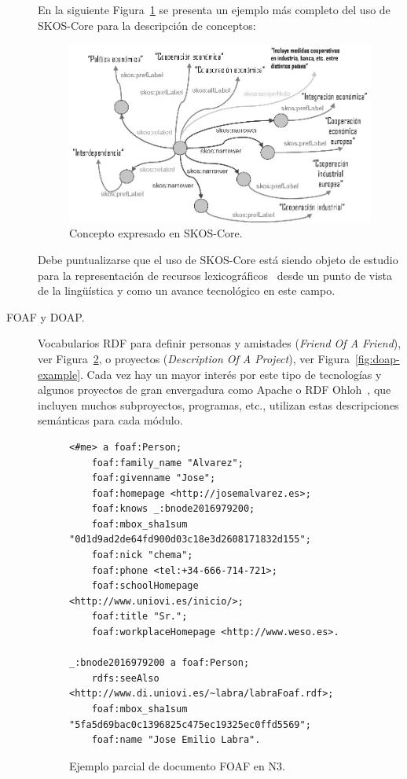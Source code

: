 \begin{description}
En la siguiente Figura~\ref{fig:skos} se presenta un ejemplo más completo del
uso de SKOS-Core para la descripción de conceptos:
 
\begin{figure}[!htbp]
\centering
	\includegraphics[width=14cm]{images/skos}
\caption{Concepto expresado en SKOS-Core.}
\label{fig:skos}
\end{figure}

Debe puntualizarse que el uso de SKOS-Core está siendo objeto de estudio para la
representación de recursos lexicográficos~\cite{Milin} desde un punto de vista de la
lingüística y como un avance tecnológico en este campo.

\item[\gls{FOAF} y \gls{DOAP}.] Vocabularios RDF para definir personas y amistades (\textit{Friend Of A Friend}), ver Figura~\ref{fig:foaf-example}, o 
proyectos (\textit{Description Of A Project}), 
ver Figura~\ref{fig:doap-example}. Cada vez hay un mayor interés por este tipo de tecnologías y algunos proyectos de gran envergadura como 
Apache o RDF Ohloh~\cite{Ferndez08rdfohloh}, que incluyen muchos subproyectos, programas, etc., utilizan estas
descripciones semánticas para cada módulo.

\begin{figure}[!htbp]
\centering
  \begin{lstlisting}
<#me> a foaf:Person;
	foaf:family_name "Alvarez";
	foaf:givenname "Jose";
	foaf:homepage <http://josemalvarez.es>;
	foaf:knows _:bnode2016979200;
	foaf:mbox_sha1sum "0d1d9ad2de64fd900d03c18e3d2608171832d155";
	foaf:nick "chema";
	foaf:phone <tel:+34-666-714-721>;
	foaf:schoolHomepage <http://www.uniovi.es/inicio/>;
	foaf:title "Sr.";
	foaf:workplaceHomepage <http://www.weso.es>.

_:bnode2016979200 a foaf:Person;
	rdfs:seeAlso <http://www.di.uniovi.es/~labra/labraFoaf.rdf>;
	foaf:mbox_sha1sum "5fa5d69bac0c1396825c475ec19325ec0ffd5569";
	foaf:name "Jose Emilio Labra".
  \end{lstlisting}
\caption{Ejemplo parcial de documento FOAF en N3.}
\label{fig:foaf-example}
\end{figure}



\end{description}
